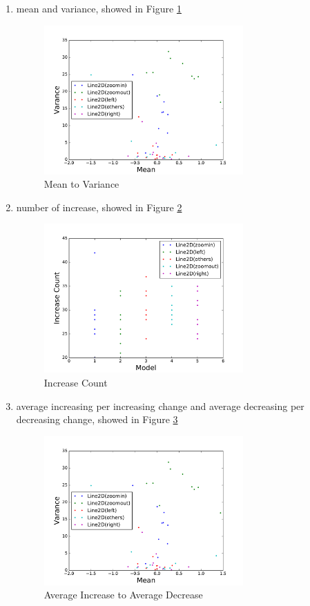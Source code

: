 \documentclass[conference]{IEEEtran}
\begin{document}
\begin{enumerate}
	\item mean and variance, showed in Figure \ref{min-var}
	\begin{figure}[H]
	\label{min-var}
	\centering
	\includegraphics[width=3in]{fs7.pdf}
	\caption{Mean to Variance}
	\end{figure}

	\item number of increase, showed in Figure \ref{inc-count}
	\begin{figure}[H]
	\label{inc-count}
	\centering
	\includegraphics[width=3in]{fs8.pdf}
	\caption{Increase Count}
	\end{figure}

	\item average increasing per increasing change and average decreasing per decreasing change, showed in Figure \ref{avg-inc-dec}
	\begin{figure}[H]
	\label{avg-inc-dec}
	\centering
	\includegraphics[width=3in]{fs7.pdf}
	\caption{Average Increase to Average Decrease}
	\end{figure}

\end{enumerate}
\end{document}
